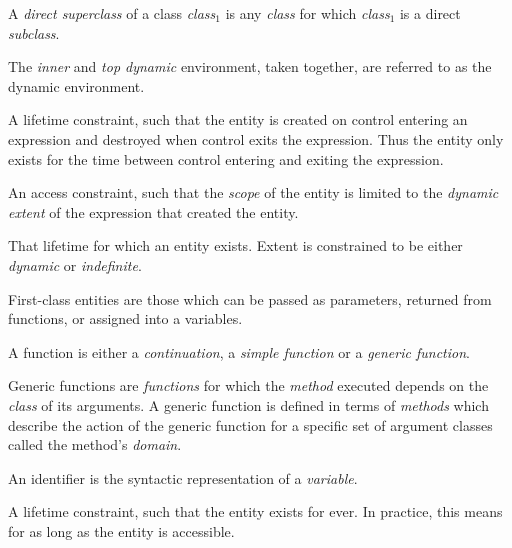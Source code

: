 \begin{optDefinition}
\begin{definitions}
     
     A {\em direct superclass} of a class {\em
        class$_1$} is any {\em class} for which {\em class$_1$} is a direct {\em
        subclass}.

     The
    {\em inner} and {\em top dynamic} environment, taken together, are referred
    to as the dynamic environment.

     A lifetime
    constraint, such that the entity is created on control entering an
    expression and destroyed when control exits the expression.  Thus the entity
    only exists for the time between control entering and exiting the
    expression.

     An access
    constraint, such that the {\em scope} of the entity is limited to the {\em
        dynamic extent} of the expression that created the entity.

     That lifetime for which an entity
    exists.  Extent is constrained to be either {\em dynamic} or {\em
        indefinite}.

     First-class entities
    are those which can be passed as parameters, returned from functions, or
    assigned into a variables.

     A function is either a {\em
        continuation}, a {\em simple function} or a {\em generic function}.

      Generic
    functions are {\em functions} for which the {\em method} executed depends on
    the {\em class} of its arguments.  A generic function is defined in terms of
    {\em methods} which describe the action of the generic function for a
    specific set of argument classes called the method's {\em domain}.

     An identifier is the
    syntactic representation of a {\em variable}.

     A lifetime
    constraint, such that the entity exists for ever.  In practice, this means
    for as long as the entity is accessible.


\end{definitions}
\end{optDefinition}
